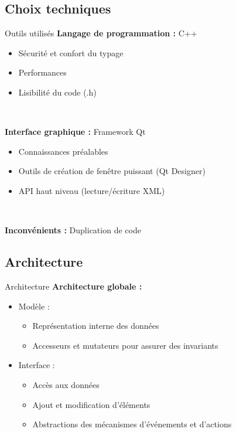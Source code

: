 \documentclass[11pt]{beamer}
\begin{document}
\subsection{Choix techniques}
\begin{frame}{Outils utilisés}
	\textbf{Langage de programmation :}
	C++
	\begin{itemize}
		\item Sécurité et confort du typage
		\item Performances
		\item Lisibilité du code (.h)
	\end{itemize}
	
	~
	
	\textbf{Interface graphique :}
	Framework Qt
	\begin{itemize}
		\item Connaissances préalables
		\item Outils de création de fenêtre puissant (Qt Designer)
		\item API haut niveau (lecture/écriture XML)
	\end{itemize}
	
	~
	
	\textbf{Inconvénients :} Duplication de code
\end{frame}

\subsection{Architecture}
\begin{frame}{Architecture}
	\textbf{Architecture globale :}
	\begin{itemize}
		\item Modèle :
		\begin{itemize}
			\item Représentation interne des données
			\item Accesseurs et mutateurs pour assurer des invariants
		\end{itemize}
		\item Interface :
		\begin{itemize}
			\item Accès aux données
			\item Ajout et modification d'éléments
			\item Abstractions des mécanismes d'événements et d'actions
		\end{itemize}
	\end{itemize}

\end{frame}
\end{document}
